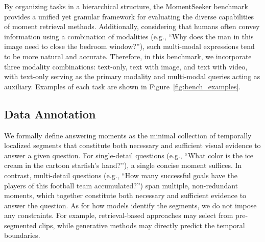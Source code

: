 \documentclass{article}
\begin{document}
By organizing tasks in a hierarchical structure, the MomentSeeker benchmark provides a unified yet granular framework for evaluating the diverse capabilities of moment retrieval methods. Additionally, considering that humans often convey information using a combination of modalities (e.g., ``Why does the man in this image need to close the bedroom window?''), such multi-modal expressions tend to be more natural and accurate. Therefore, in this benchmark, we incorporate three modality combinations: text-only, text with image, and text with video, with text-only serving as the primary modality and multi-modal queries acting as auxiliary. Examples of each task are shown in Figure~\ref{fig:bench_examples}.




\subsection{Data Annotation}
We formally define answering moments as the minimal collection of temporally localized segments that constitute both necessary and sufficient visual evidence to answer a given question. For single-detail questions (e.g., ``What color is the ice cream in the cartoon starfish's hand?''), a single concise moment suffices. In contrast, multi-detail questions (e.g., ``How many successful goals have the players of this football team accumulated?'') span multiple, non-redundant moments, which together constitute both necessary and sufficient evidence to answer the question. As for how models identify the segments, we do not impose any constraints. For example, retrieval-based approaches may select from pre-segmented clips, while generative methods may directly predict the temporal boundaries.
\end{document}

